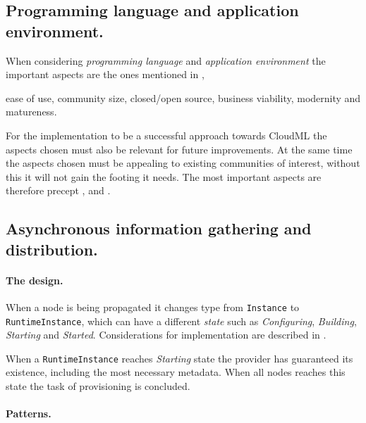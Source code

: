 
\subsection{Programming language and application environment.}

When considering \emph{programming language} and \emph{application environment} 
the important aspects are the ones mentioned in ,
\begin{ii}
  \iitem ease of use,
  \iitem community size,
  \iitem closed/open source,
  \iitem business viability,
  \iitem modernity and 
  \iitem matureness.
\end{ii}
For the implementation to be a successful approach towards CloudML 
the aspects chosen must also be relevant for future improvements.
At the same time the aspects chosen must be appealing to existing communities of interest,
without this it will not gain the footing it needs.
The most important aspects are therefore precept ,  and .

\subsection{Asynchronous information gathering and distribution.}

\paragraph{The design.}

When a node is being propagated it changes type from \texttt{Instance} to 
\texttt{RuntimeInstance}, which can have a different \emph{state} such as 
\emph{Configuring}, \emph{Building}, \emph{Starting} and \emph{Started}.
Considerations for implementation are described in .

When a \texttt{RuntimeInstance} reaches \emph{Starting} state the provider 
has guaranteed its existence, including the most necessary metadata.
When all nodes reaches this state the task of provisioning is concluded.

\paragraph{Patterns.}

